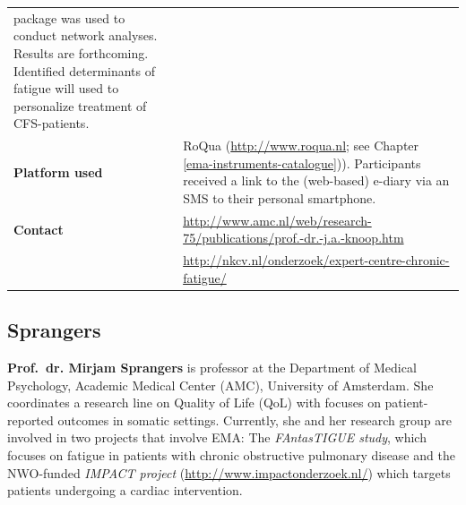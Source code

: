 \documentclass[]{book}
\begin{document}
\begin{longtable}[]{@{}ll@{}}
\begin{minipage}[t]{0.69\columnwidth}
package was used to conduct network analyses. Results are forthcoming.
Identified determinants of fatigue will used to personalize treatment of
CFS-patients.\strut
\end{minipage}\tabularnewline
\begin{minipage}[t]{0.25\columnwidth}\raggedright\strut
\textbf{Platform used}\strut
\end{minipage} & \begin{minipage}[t]{0.69\columnwidth}\raggedright\strut
RoQua (\url{http://www.roqua.nl}; see Chapter
\ref{ema-instruments-catalogue})). Participants received a link to the
(web-based) e-diary via an SMS to their personal smartphone.\strut
\end{minipage}\tabularnewline
\begin{minipage}[t]{0.25\columnwidth}\raggedright\strut
\textbf{Contact}\strut
\end{minipage} & \begin{minipage}[t]{0.69\columnwidth}\raggedright\strut
\url{http://www.amc.nl/web/research-75/publications/prof.-dr.-j.a.-knoop.htm}\strut
\end{minipage}\tabularnewline
\begin{minipage}[t]{0.25\columnwidth}\raggedright\strut
\strut
\end{minipage} & \begin{minipage}[t]{0.69\columnwidth}\raggedright\strut
\url{http://nkcv.nl/onderzoek/expert-centre-chronic-fatigue/}\strut
\end{minipage}\tabularnewline
\bottomrule
\end{longtable}

\subsection{Sprangers}\label{sprangers}

 

\textbf{Prof.~dr. Mirjam Sprangers} is professor at the Department of
Medical Psychology, Academic Medical Center (AMC), University of
Amsterdam. She coordinates a research line on Quality of Life (QoL) with
focuses on patient-reported outcomes in somatic settings. Currently, she
and her research group are involved in two projects that involve EMA:
The \emph{FAntasTIGUE study}, which focuses on fatigue in patients with
chronic obstructive pulmonary disease and the NWO-funded \emph{IMPACT
project} (\url{http://www.impactonderzoek.nl/}) which targets patients
undergoing a cardiac intervention.
\end{document}
